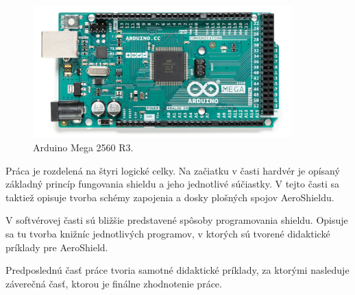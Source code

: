 \begin{figure}[!tbh]
	\centering
	\includegraphics[width=100mm]{obr/mega.png}
	\caption{{Arduino Mega 2560 R3.\cite{megafoto}}}\label{OBRAZOK 1.32}
\end{figure}

\newpage
Práca je rozdelená na štyri logické celky. Na začiatku v časti hardvér je opísaný základný princíp fungovania shieldu a jeho jednotlivé súčiastky. V tejto časti sa taktiež opisuje tvorba schémy zapojenia a dosky plošných spojov AeroShieldu. 

V softvérovej časti sú bližšie predstavené spôsoby programovania shieldu. Opisuje sa tu tvorba knižníc jednotlivých programov, v ktorých sú tvorené didaktické príklady pre AeroShield.

Predposlednú časť práce tvoria samotné didaktické príklady, za ktorými nasleduje záverečná časť, ktorou je finálne zhodnotenie práce.




